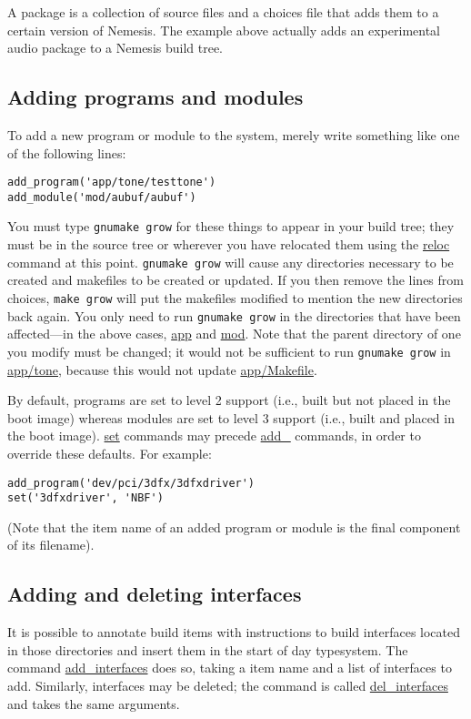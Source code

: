\documentclass[a4paper]{article}
\newcommand{\cmd}[1]{\texttt{#1}}
\begin{document}
A package is a collection of source files and a choices file that adds
them to a certain version of Nemesis. The example above actually adds
an experimental audio package to a Nemesis build tree.

\subsection{Adding programs and modules}

To add a new program or module to the system, merely write something
like one of the following lines:

\begin{verbatim}
add_program('app/tone/testtone')
add_module('mod/aubuf/aubuf')
\end{verbatim}

You must type \cmd{gnumake grow} for these things to appear in your build
tree; they must be in the source tree or wherever you have relocated
them using the \url{reloc} command at this point. \cmd{gnumake grow}
will cause any directories necessary to be created and makefiles to be
created or updated. If you then remove the lines from choices,
\cmd{make grow} will put the makefiles modified to mention the new
directories back again. You only need to run \cmd{gnumake grow} in the
directories that have been affected---in the above cases, \url{app} and
\url{mod}. Note that the parent directory of one you modify must be
changed; it would not be sufficient to run \cmd{gnumake grow} in
\url{app/tone}, because this would not update \url{app/Makefile}. 

By default, programs are set to  level 2 support (i.e., built but not
placed in the boot image) whereas modules are set to level 3 support (i.e.,
built and placed in the boot image). \url{set} commands may precede
\url{add_} commands, in order to override these defaults. For example:

\begin{verbatim}
add_program('dev/pci/3dfx/3dfxdriver')
set('3dfxdriver', 'NBF')
\end{verbatim}

(Note that the item name of an added program or module is the final
component of its filename).

\subsection{Adding and deleting interfaces}

It is possible to annotate build items with instructions to build
interfaces located in those directories and insert them in the start
of day typesystem. The command \url{add_interfaces} does so, taking a
item name and a list of interfaces to add. Similarly, interfaces may
be deleted; the command is called \url{del_interfaces} and takes the
same arguments.
\end{document}
